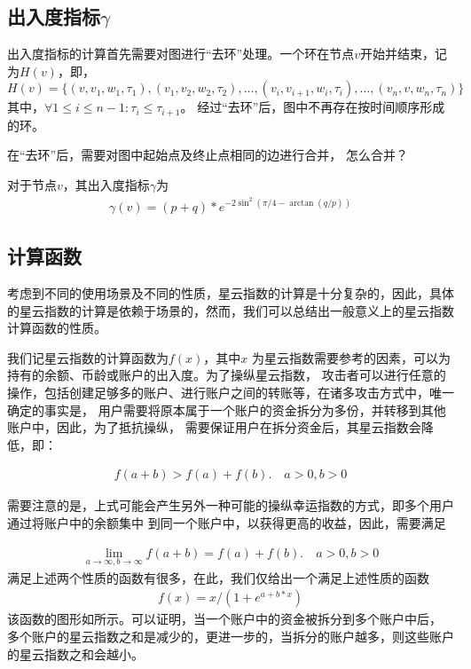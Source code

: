\subsection*{出入度指标$\gamma$}
出入度指标的计算首先需要对图进行“去环”处理。一个环在节点$v$开始并结束，记为$H(v)$，即，
\[
H(v) = \{(v, v_1, w_1, \tau_1), (v_1, v_2, w_2, \tau_2), \dots, (v_i, v_{i+1}, w_{i}, \tau_i), \dots, (v_n, v, w_n, \tau_n)\}
\]
\noindent 其中，$\forall 1\le i \le {n-1} : \tau_i \le \tau_{i+1} $。
经过“去环”后，图中不再存在按时间顺序形成的环。

在“去环”后，需要对图中起始点及终止点相同的边进行合并，{\color{red} 怎么合并？}


对于节点$v$，其出入度指标$\gamma$为
\begin{align}
\gamma(v) = (p + q) * e^{-2\sin^2{(\pi/4 - \arctan(q/p))}}
\end{align}

\subsection*{计算函数}
考虑到不同的使用场景及不同的性质，星云指数的计算是十分复杂的，因此，具体的星云指数的计算是依赖于场景的，然而，我们可以总结出一般意义上的星云指数计算函数的性质。

我们记星云指数的计算函数为\(f(x)\)，其中\(x\)
为星云指数需要参考的因素，可以为持有的余额、币龄或账户的出入度。为了操纵星云指数，
攻击者可以进行任意的操作，包括创建足够多的账户、进行账户之间的转账等，在诸多攻击方式中，唯一确定的事实是，
{\color{red} 用户需要将原本属于一个账户的资金拆分为多份，并转移到其他账户中}，因此，为了抵抗操纵，
需要保证用户在拆分资金后，其星云指数会降低，即：

\begin{align}
f(a + b) > f(a) + f(b).\quad a>0, b>0
\end{align}

需要注意的是，上式可能会产生另外一种可能的操纵幸运指数的方式，即多个用户通过将账户中的余额集中
到同一个账户中，以获得更高的收益，因此，需要满足

\begin{align}
\lim\limits_{a \to \infty, b\to \infty} f(a+b) = f(a) + f(b).\quad a>0, b>0
\end{align}
满足上述两个性质的函数有很多，在此，我们仅给出一个满足上述性质的函数
\begin{align}
f(x) = x/(1 + e^{a + b*x})
\end{align}
\noindent 该函数的图形如所示。可以证明，当一个账户中的资金被拆分到多个账户中后，
多个账户的星云指数之和是减少的，更进一步的，当拆分的账户越多，则这些账户的星云指数之和会越小。

